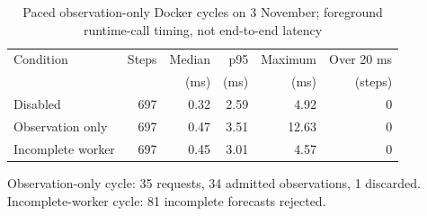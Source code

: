 \begin{table}[t]
\caption{Paced observation-only Docker cycles on 3 November; foreground runtime-call timing, not end-to-end latency}
\label{tab:background}
\centering\small
\begin{tabular}{lrrrrr}
\toprule
Condition & Steps & Median & p95 & Maximum & Over 20 ms\\
 & & (ms) & (ms) & (ms) & (steps)\\
\midrule
Disabled & 697 & 0.32 & 2.59 & 4.92 & 0\\
Observation only & 697 & 0.47 & 3.51 & 12.63 & 0\\
Incomplete worker & 697 & 0.45 & 3.01 & 4.57 & 0\\
\bottomrule
\end{tabular}
\par\smallskip\footnotesize Observation-only cycle: 35 requests, 34 admitted observations, 1 discarded. Incomplete-worker cycle: 81 incomplete forecasts rejected.
\end{table}
